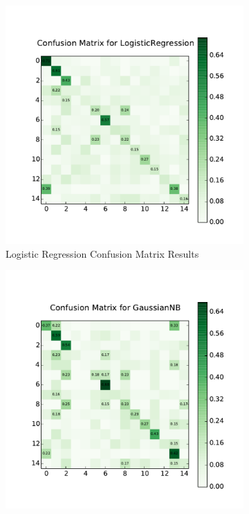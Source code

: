 \begin{figure}[H]
	\centering
	\begin{subfigure}[b]{0.45\linewidth}
		\centering
		\includegraphics[width=\linewidth]{images/baseline/cm_log_reg.pdf}
		\caption{Logistic Regression Confusion Matrix Results}
	\end{subfigure}
	\hfill
	\begin{subfigure}[b]{0.45\linewidth}
		\centering
		\includegraphics[width=\linewidth]{images/baseline/cm_naive_bayes.pdf}

\end{subfigure}
\end{figure}
